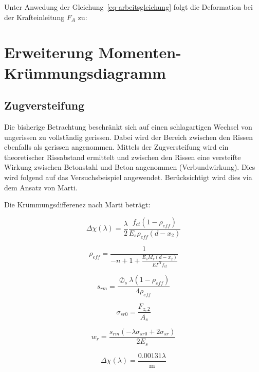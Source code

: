 \documentclass[
  12pt,
  letterpaper,
  egregdoesnotlikesansseriftitles]{scrreprt}
\begin{document}
Unter Anwedung der Gleichung~\ref{eq-arbeitsgleichung} folgt die
Deformation bei der Krafteinleitung \(F_A\) zu:

\hypertarget{erweiterung-momenten-kruxfcmmungsdiagramm}{%
\section{Erweiterung
Momenten-Krümmungsdiagramm}\label{erweiterung-momenten-kruxfcmmungsdiagramm}}

\hypertarget{zugversteifung}{%
\subsection{Zugversteifung}\label{zugversteifung}}

Die bisherige Betrachtung beschränkt sich auf einen schlagartigen
Wechsel von ungerissen zu vollständig gerissen. Dabei wird der Bereich
zwischen den Rissen ebenfalls als gerissen angenommen. Mittels der
Zugversteifung wird ein theoretischer Rissabstand ermittelt und zwischen
den Rissen eine versteifte Wirkung zwischen Betonstahl und Beton
angenommen (Verbundwirkung). Dies wird folgend auf das Versuchsbeispiel
angewendet. Berücksichtigt wird dies via dem Ansatz von Marti.

Die Krümmungsdifferenez nach Marti beträgt:

\begin{equation}\Delta\chi{\left(\lambda \right)} = \frac{\lambda}{2} \frac{f_{ct} \left(1 - \rho_{eff}\right)}{E_{s} \rho_{eff} \left(d - x_{2}\right)}\end{equation}

\begin{equation}\rho_{eff} = \frac{1}{- n + 1 + \frac{E_{s} M_{r} \left(d - x_{2}\right)}{EI^{II} f_{ct}}}\end{equation}

\begin{equation}s_{rm} = \frac{\oslash_{s} \lambda \left(1 - \rho_{eff}\right)}{4 \rho_{eff}}\end{equation}

\begin{equation}\sigma_{sr0} = \frac{F_{z,2}}{A_{s}}\end{equation}

\begin{equation}w_{r} = \frac{s_{rm} \left(- \lambda \sigma_{sr0} + 2 \sigma_{sr}\right)}{2 E_{s}}\end{equation}

\begin{equation}\Delta\chi{\left(\lambda \right)} = \frac{0.00131 \lambda}{\text{m}}\end{equation}
\end{document}

